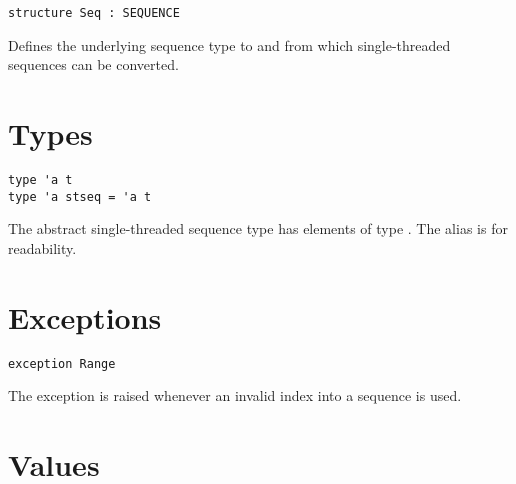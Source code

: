 \begin{cluster}
\label{grp:gr:st-seq-interface:Seq}

\begin{gram}[Seq]
\label{gr:st-seq-interface:Seq}
\begin{verbatim}
structure Seq : SEQUENCE
\end{verbatim}
Defines the underlying sequence type to and from which single-threaded
sequences can be converted.

\end{gram}
\end{cluster}


\section{Types}
\label{sec:st-seq-interface::types}

\begin{cluster}
\label{grp:grm:st-seq-interface::type}

\begin{gram}
\label{grm:st-seq-interface::type}
\begin{verbatim}
type 'a t
type 'a stseq = 'a t
\end{verbatim}
The abstract single-threaded sequence type  has elements of type
. The alias  is for readability.

\end{gram}
\end{cluster}


\section{Exceptions}
\label{sec:st-seq-interface::exceptions}

\begin{cluster}
\label{grp:grm:st-seq-interface::exception}

\begin{gram}
\label{grm:st-seq-interface::exception}
\begin{verbatim}
exception Range
\end{verbatim}
The  exception is raised whenever an invalid index into a sequence
is used.

\end{gram}
\end{cluster}


\section{Values}
\label{sec:st-seq-interface::values}

